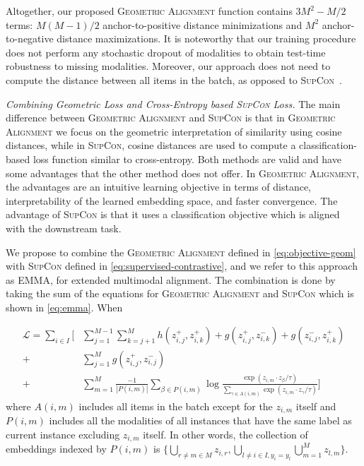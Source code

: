 \documentclass[sigconf,natbib=true,anonymous=true]{acmart}
\newcommand{\todokdinline}[1]{\todo[color=red!20,inline]{{KD: \small #1}}}
\newcommand{\ours}{\textsc{EMMA}}
\newcommand{\geom}{\textsc{Geometric Alignment}}
\newcommand{\supcon}{\textsc{SupCon}}
\begin{document}
Altogether, our proposed \geom{} function contains 
$3M^2-M/2$ terms: 
$M(M-1)/2$ anchor-to-positive distance minimizations and $M^2$ anchor-to-negative distance maximizations.
It is noteworthy that our training procedure does not perform any stochastic dropout of modalities to obtain test-time robustness to missing modalities. Moreover, our approach does not need to compute the distance between all items in the batch, as opposed to \supcon{}~\citep{NEURIPS2020_supervised_contrastive}.


\textit{Combining Geometric Loss and Cross-Entropy based \supcon{} Loss.}
The main difference between \geom{} and \supcon{} is that in \geom{} we focus on the geometric interpretation of similarity using cosine distances, while in \supcon{}, cosine distances are used to compute a classification-based loss function similar to cross-entropy.
Both methods are valid and have some advantages that the other method does not offer. In \geom{}, the advantages are an intuitive learning objective in terms of distance, interpretability of the learned embedding space, and faster convergence. 
The advantage of \supcon{} is that it uses a classification objective which is aligned with the downstream task.

We propose to combine the \geom{} defined in \cref{eq:objective-geom} with \supcon{} defined in \cref{eq:supervised-contrastive}, and we refer to this approach as \ours{}, for extended multimodal alignment. The combination is done by taking the sum of the equations for \geom{} and \supcon{} which is shown in \cref{eq:emma}.
When


\begin{equation}\label{eq:emma}
\begin{split}
    \mathcal{L} =  \sum_{i \in I} \Biggl[ & \sum_{j=1}^{M-1} \sum_{k=j+1}^{M} h( z_{i,j}^{+} , z_{i,k}^{+})
     + g( z_{i,j}^{+} , z_{i,k}^{-}) + g( z_{i,j}^{-} , z_{i,k}^{+}) \\ 
     + & \sum_{j=1}^{M} g( z_{i,j}^{+} , z_{i,j}^{-} ) \\
    + & \sum_{m=1}^{M} \frac{-1}{|P(i,m)|}  \sum_{\beta \in P(i,m)} \log \frac{\exp (z_{i,m} \cdot z_{\beta} / \tau) }{\sum_{\gamma \in A(i,m)} \exp (z_{i,m} \cdot z_{\gamma} / \tau)} \Biggr]
     \end{split}
\end{equation}
where $A(i,m)$ includes all items in the batch except for the $z_{i,m}$ itself and $P(i,m)$ includes all the modalities of all instances that have the same label as current instance excluding $z_{i,m}$ itself. 
In other words, the collection of embeddings indexed by $P(i,m)$ is $\{ \bigcup\limits_{r \neq m \in M} z_{i,r}, \bigcup\limits_{l \neq i \in I , y_i = y_l} \bigcup\limits_{m=1}^{M} z_{l,m} \} $.
\end{document}
